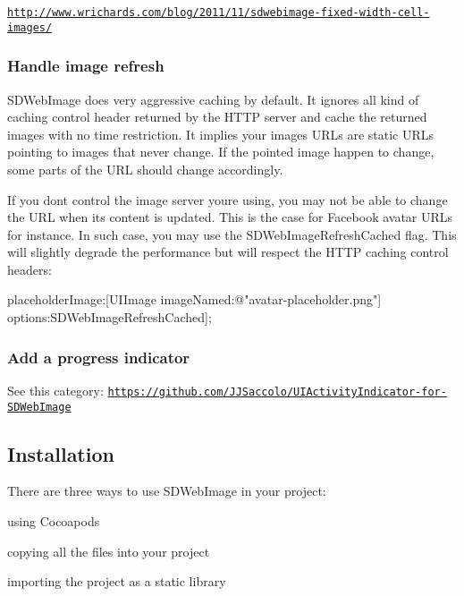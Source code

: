 \href{http://www.wrichards.com/blog/2011/11/sdwebimage-fixed-width-cell-images/}{\tt http\+://www.\+wrichards.\+com/blog/2011/11/sdwebimage-\/fixed-\/width-\/cell-\/images/}

\subsubsection*{Handle image refresh}

S\+D\+Web\+Image does very aggressive caching by default. It ignores all kind of caching control header returned by the H\+T\+TP server and cache the returned images with no time restriction. It implies your images U\+R\+Ls are static U\+R\+Ls pointing to images that never change. If the pointed image happen to change, some parts of the U\+RL should change accordingly.

If you don\textquotesingle{}t control the image server you\textquotesingle{}re using, you may not be able to change the U\+RL when its content is updated. This is the case for Facebook avatar U\+R\+Ls for instance. In such case, you may use the {\ttfamily S\+D\+Web\+Image\+Refresh\+Cached} flag. This will slightly degrade the performance but will respect the H\+T\+TP caching control headers\+:


\begin{DoxyCode}
[imageView sd\_setImageWithURL:[NSURL URLWithString:@"https://graph.facebook.com/olivier.poitrey/picture"]
                 placeholderImage:[UIImage imageNamed:@"avatar-placeholder.png"]
                          options:SDWebImageRefreshCached];
\end{DoxyCode}


\subsubsection*{Add a progress indicator}

See this category\+: \href{https://github.com/JJSaccolo/UIActivityIndicator-for-SDWebImage}{\tt https\+://github.\+com/\+J\+J\+Saccolo/\+U\+I\+Activity\+Indicator-\/for-\/\+S\+D\+Web\+Image}

\subsection*{Installation }

There are three ways to use S\+D\+Web\+Image in your project\+:
\begin{DoxyItemize}
\item using Cocoapods
\item copying all the files into your project
\item importing the project as a static library
\end{DoxyItemize}

